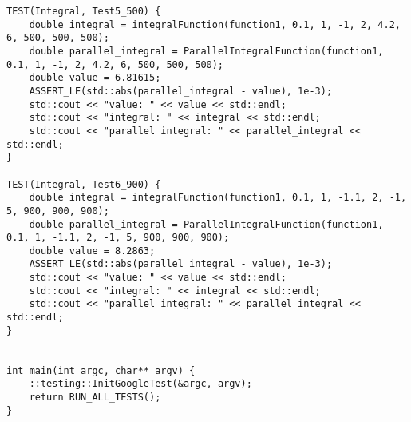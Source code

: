 \documentclass{report}
\begin{document}
\begin{lstlisting}
TEST(Integral, Test5_500) {
    double integral = integralFunction(function1, 0.1, 1, -1, 2, 4.2, 6, 500, 500, 500);
    double parallel_integral = ParallelIntegralFunction(function1, 0.1, 1, -1, 2, 4.2, 6, 500, 500, 500);
    double value = 6.81615;
    ASSERT_LE(std::abs(parallel_integral - value), 1e-3);
    std::cout << "value: " << value << std::endl;
    std::cout << "integral: " << integral << std::endl;
    std::cout << "parallel integral: " << parallel_integral << std::endl;
}

TEST(Integral, Test6_900) {
    double integral = integralFunction(function1, 0.1, 1, -1.1, 2, -1, 5, 900, 900, 900);
    double parallel_integral = ParallelIntegralFunction(function1, 0.1, 1, -1.1, 2, -1, 5, 900, 900, 900);
    double value = 8.2863;
    ASSERT_LE(std::abs(parallel_integral - value), 1e-3);
    std::cout << "value: " << value << std::endl;
    std::cout << "integral: " << integral << std::endl;
    std::cout << "parallel integral: " << parallel_integral << std::endl;
}


int main(int argc, char** argv) {
    ::testing::InitGoogleTest(&argc, argv);
    return RUN_ALL_TESTS();
}

\end{lstlisting}
\end{document}
